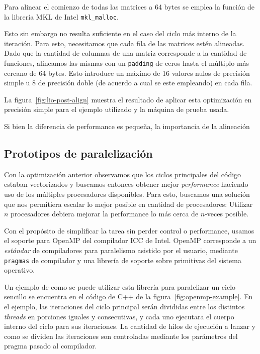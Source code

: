 Para alinear el comienzo de todas las matrices a 64 bytes se emplea la funci\'on
de la librer\'ia MKL de Intel \texttt{mkl\_malloc}.

Esto sin embargo no resulta suficiente en el caso del ciclo m\'as interno de
la iteraci\'on. Para esto, necesitamos que cada fila de las matrices est\'en alineadas.
Dado que la cantidad de columnas de una matriz corresponde a la cantidad de funciones,
alineamos las mismas con un \texttt{padding} de ceros hasta el m\'ultiplo m\'as
cercano de 64 bytes. Esto introduce un m\'aximo de 16 valores nulos de precisi\'on
simple u 8 de precisi\'on doble (de acuerdo a cual se este empleando) en cada
fila.

La figura~\ref{fig:lio-post-align} muestra el resultado de aplicar esta optimizaci\'on
en precisi\'on simple para el ejemplo utilizado y la m\'aquina de prueba usada.

Si bien la diferencia de performance es peque\~na, la importancia de la
alineaci\'on


\subsection{Prototipos de paralelizaci\'on}

Con la optimizaci\'on anterior observamos que los ciclos principales del c\'odigo
estaban vectorizados y buscamos entonces obtener mejor \textit{performance} haciendo
uso de los m\'ultiples procesadores disponibles. Para esto, buscamos una soluci\'on
que nos permitiera escalar lo mejor posible en cantidad de procesadores: Utilizar
$n$ procesadores debiera mejorar la performance lo m\'as cerca de $n$-veces posible.


Con el prop\'osito de simplificar la tarea sin perder control o performance,
usamos el soporte para OpenMP del compilador ICC de Intel. OpenMP corresponde a
un \textit{est\'andar} de compiladores para paralelismo asistido por el usuario,
mediante \texttt{pragmas} de compilador y una librer\'ia de soporte sobre
primitivas del sistema operativo.

Un ejemplo de como se puede utilizar esta librer\'ia para paralelizar un ciclo
sencillo se encuentra en el c\'odigo de C++ de la figura~\ref{fig:openmp-example}.
En el ejemplo, las iteraciones del ciclo principal ser\'an divididas entre los
distintos \textit{threads} en porciones iguales y consecutivas, y cada uno
ejecutara el cuerpo interno del ciclo para sus iteraciones. La cantidad de
hilos de ejecuci\'on a lanzar y como se dividen las iteraciones son controladas
mediante los par\'ametros del pragma pasado al compilador.

